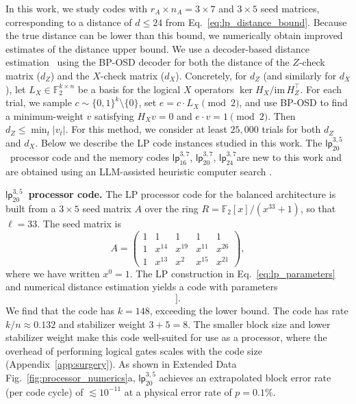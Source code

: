 \documentclass[reprint,twocolumn,secnumarabic,amssymb, aps, prx]{revtex4-2}
\newcommand{\lpmemlarge}{\mbox{$\mathsf{lp}_{24}^{3, 7}$}}
\newcommand{\lpmemmed}{\mbox{$\mathsf{lp}^{3, 7}_{20}$}}
\newcommand{\lpmemsmall}{\mbox{$\mathsf{lp}^{3, 7}_{16}$}}
\newcommand{\lpproc}{\mbox{$\mathsf{lp}^{3, 5}_{20}$}}
\begin{document}
In this work, we study codes with \mbox{$r_A\times n_A=3\times 7$} and $3\times5$ seed matrices, corresponding to a distance of $d\leq 24$ from Eq.~\eqref{eq:lp_distance_bound}. Because the true distance can be lower than this bound, we numerically obtain improved estimates of the distance upper bound. We use a decoder-based distance estimation~\cite{bravyi2024high} using the BP-OSD decoder \cite{roffe2020decoding} for both the distance of the $Z$-check matrix ($d_Z$) and the $X$-check matrix ($d_X$). Concretely, for $d_Z$ (and similarly for $d_X$), let $L_X \in \mathbb{F}_2^{k \times n}$ be a basis for the logical $X$ operators $\ker H_X / \mathrm{im}\, H_Z^\top$. For each trial, we sample $c \sim \{0,1\}^k \setminus \{0\}$, set $e = c \cdot L_X \pmod{2}$, and use BP-OSD to find a minimum-weight $v$ satisfying $H_X v = 0$ and $e \cdot v = 1 \pmod{2}$. Then $d_Z \leq \min_t |v_t|$. For this method, we consider at least $25,000$ trials for both $d_Z$ and $d_X$. Below we describe the LP code instances studied in this work. The \lpproc\ processor code and the memory codes \lpmemsmall, \lpmemmed, \lpmemlarge are new to this work and are obtained using an LLM-assisted heuristic computer search \cite{caltech2026codeatlas}.

\medskip
\noindent\textbf{\lpproc\ processor code.}
The LP processor code for the balanced architecture is built from a $3 \times 5$ seed matrix $A$ over the ring \mbox{$R = \mathbb{F}_2[x]/(x^{33}+1)$}, so that $\ell = 33$. The seed matrix is
\begin{equation}\label{eq:seed_lp20}
  A = \begin{pmatrix}
    1      & 1      & 1      & 1      & 1      \\
    1      & x^{14}  & x^{19} & x^{11} & x^{26} \\
    1      & x^{13} & x^{2} & x^{15} & x^{21}
  \end{pmatrix},
\end{equation}
where we have written $x^0 = 1$. The LP construction in Eq.~\eqref{eq:lp_parameters} and numerical distance estimation yields a code with parameters
\begin{equation}
  [[n = 1122, \quad k \geq 132, \quad d \leq 20\,]].
\end{equation}
We find that the code has \mbox{$k = 148$}, exceeding the lower bound. The code has rate $k/n \approx 0.132$ and stabilizer weight \mbox{$3 + 5 = 8$}. The smaller block size and lower stabilizer weight make this code well-suited for use as a processor, where the overhead of performing logical gates scales with the code size (Appendix~\ref{app:surgery}). As shown in Extended Data Fig.~\ref{fig:processor_numerics}a, $\lpproc$ achieves an extrapolated block error rate (per code cycle) of $\lesssim 10^{-11}$ at a physical error rate of $p=0.1\%$.
\end{document}
